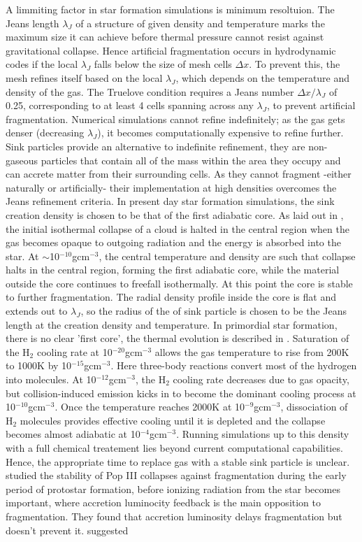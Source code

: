 \documentclass[fleqn,usenatbib]{mnras}
\begin{document}
A limmiting factor in star formation simulations is minimum resoltuion. The Jeans length $\lambda_J$ of a structure of given density and temperature marks the maximum size it can achieve before thermal pressure cannot resist against gravitational collapse. Hence artificial fragmentation occurs in hydrodynamic codes if the local $\lambda_J$ falls below the size of mesh cells $\Delta x$. To prevent this, the mesh refines itself based on the local $\lambda_J$, which depends on the temperature and density of the gas. The Truelove condition \citep{Truelove1997} requires a Jeans number $\Delta x/\lambda_J$ of 0.25, corresponding to at least 4 cells spanning across any $\lambda_J$, to prevent artificial fragmentation. Numerical simulations cannot refine indefinitely; as the gas gets denser (decreasing $\lambda_J$), it becomes computationally expensive to refine further. Sink particles \citep{Bate1995} provide an alternative to indefinite refinement, they are non-gaseous particles that contain all of the mass within the area they occupy and can accrete matter from their surrounding cells. As they cannot fragment -either naturally or artificially- their implementation at high densities overcomes the Jeans refinement criteria. In present day star formation simulations, the sink creation density is chosen to be that of the first adiabatic core. As laid out in \cite{Larson1969}, the initial isothermal collapse of a cloud is halted in the central region when the gas becomes opaque to outgoing radiation and the energy is absorbed into the star. At $\sim$10$^{-10}$gcm$^{-3}$, the central temperature and density are such that collapse halts in the central region, forming the first adiabatic core, while the material outside the core continues to freefall isothermally. At this point the core is stable to further fragmentation. The radial density profile inside the core is flat and extends out to $\lambda_J$, so the radius of the of sink particle is chosen to be the Jeans length at the creation density and temperature. In primordial star formation, there is no clear 'first core', the thermal evolution is described in \cite{Omukai2005}. Saturation of the H$_2$ cooling rate at 10$^{-20}$gcm$^{-3}$ allows the gas temperature to rise from 200K to 1000K by 10$^{-15}$gcm$^{-3}$. Here three-body reactions convert most of the hydrogen into molecules. At 10$^{-12}$gcm$^{-3}$, the H$_2$ cooling rate decreases due to  gas opacity, but collision-induced emission kicks in to become the dominant cooling process at 10$^{-10}$gcm$^{-3}$. Once the temperature reaches 2000K at 10$^{-9}$gcm$^{-3}$, dissociation of H$_2$ molecules provides effective cooling until it is depleted and the collapse becomes almost adiabatic at 10$^{-4}$gcm$^{-3}$. Running simulations up to this density with a full chemical treatement lies beyond current computational capabilities. Hence, the appropriate time to replace gas with a stable sink particle is unclear. \cite{Smith2011} studied the stability of Pop III collapses against fragmentation during the early period of protostar formation, before ionizing radiation from the star becomes important, where accretion luminocity feedback is the main opposition to fragmentation. They found that accretion luminosity delays fragmentation but doesn’t prevent it. \cite{Gammie2001} suggested 
\end{document}
